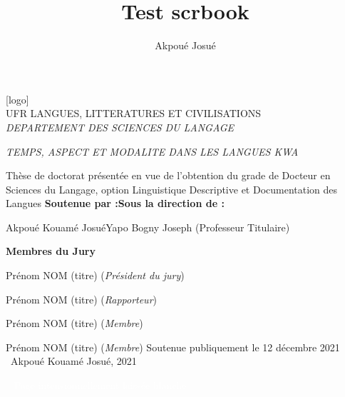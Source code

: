 \documentclass[12pt,oneside]{scrbook}[2015/10/03]
\author{Akpoué Josué}
\title{Test scrbook}
\begin{document}
	\def\covcol{blue!11!white}
	\begin{titlepage}
		\fontsize{13pt}{13pt}\selectfont
		\pagecolor{\covcol}
		\centering
		\vspace*{1em}
		[logo]\\
		\vspace*{.5em}
		UFR LANGUES, LITTERATURES ET CIVILISATIONS\\
		\textit{DEPARTEMENT DES SCIENCES DU LANGAGE}\par
		\vfil
			\def\boxsep{.7pt}
		\begin{mdframed}[linewidth=.7pt,%
			roundcorner=18pt,innerbottommargin=\boxsep,innerleftmargin=\boxsep,innerrightmargin=\boxsep,innertopmargin=\boxsep,backgroundcolor=\covcol]
			\begin{mdframed}[linewidth=3.4pt,%
				roundcorner=17pt,innerbottommargin=\boxsep,innerleftmargin=\boxsep,innerrightmargin=\boxsep,innertopmargin=\boxsep,backgroundcolor=\covcol]
				\renewcommand\boxsep{2.5em}
				\begin{mdframed}[linewidth=.7pt,%
					roundcorner=16pt,innerbottommargin=\boxsep,innertopmargin=\boxsep,innerleftmargin=\boxsep,innerrightmargin=\boxsep,backgroundcolor=\covcol]
					\begin{center}
						{\LARGE
						\sffamily 
						\itshape
						TEMPS, ASPECT ET MODALITE DANS LES LANGUES KWA}
					\end{center}
				\end{mdframed}
			\end{mdframed}
		\end{mdframed}
		\vspace*{2em}
		Thèse de doctorat présentée en vue de l’obtention du grade de  Docteur en Sciences du Langage, 
		option Linguistique Descriptive et Documentation des Langues
		\vfil 
		\textbf{Soutenue par :}\hfill\textbf{Sous la direction de :}\par
		Akpoué Kouamé Josué\hfill Yapo Bogny Joseph (Professeur Titulaire)\par 
		\vfil
		\textbf{Membres du Jury}\par\vspace*{1em}
		Prénom NOM (titre) (\textit{Président du jury})\par 
		Prénom NOM (titre) (\textit{Rapporteur})\par 
		Prénom NOM (titre) (\textit{Membre})\par 
		Prénom NOM (titre) (\textit{Membre})
		\vfil
		Soutenue publiquement le 12 décembre 2021
		\vfil 
		\textcopyright~Akpoué Kouamé Josué, 2021
	\end{titlepage}\pagecolor{white}
	\mainmatter
	\pagestyle{empty}
	\vfil
	\begin{center}
		\textcolor{white}{-- Page intensionnellement laissée blanche --}
	\end{center}
	\vfil
\end{document}
